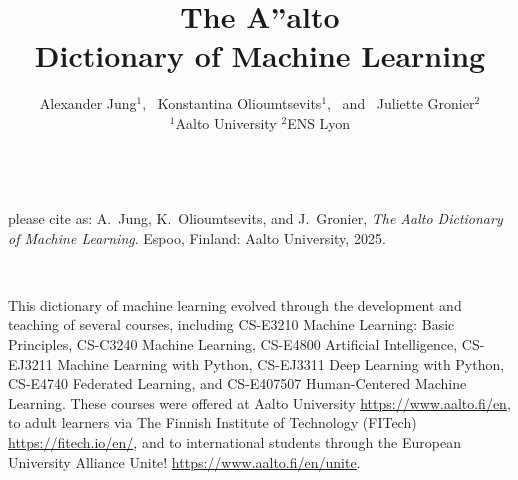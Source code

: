 \documentclass[journal,12pt,onecolumn]{article}
\begin{document}

\title {\vspace*{10mm}
	{\huge {\bf The {\fontsize{40}{48}\selectfont \textbf{\textsf{A\hspace*{-2mm}''}}}\hspace*{-4mm}alto \\ Dictionary of Machine Learning}}  \\[-5mm] 
}


\author{\hspace{-2mm}Alexander Jung${}^{1}$, \ Konstantina Olioumtsevits${}^{1}$, \ and \ Juliette Gronier${}^{2}$ \\[-2mm]
	${}^{1}$Aalto University \quad ${}^{2}$ENS Lyon
}

\maketitle
	\begin{center}
		\\[10mm]
{\large	please cite as: A.\ Jung, K.\ Olioumtsevits, and J.\ Gronier, \textit{The Aalto Dictionary of Machine Learning}. Espoo, Finland: Aalto University, 2025.}
\end{center}

\newpage 
{}\

\noindent This dictionary of machine learning evolved through the development 
and teaching of several courses, including CS-E3210 Machine Learning: Basic Principles, 
CS-C3240 Machine Learning, CS-E4800 Artificial Intelligence, CS-EJ3211 Machine Learning with Python, 
CS-EJ3311 Deep Learning with Python, CS-E4740 Federated Learning, and 
CS-E407507 Human-Centered Machine Learning. These courses were offered at 
Aalto University \url{https://www.aalto.fi/en}, to adult learners via 
The Finnish Institute of Technology (FITech) \url{https://fitech.io/en/}, and to international 
students through the European University Alliance Unite! \url{https://www.aalto.fi/en/unite}.
\end{document}
